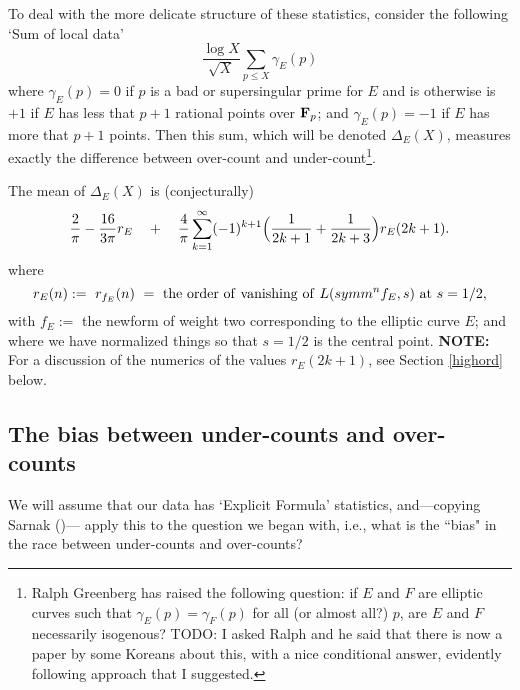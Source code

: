 \documentclass[11pt]{article}
\theoremstyle{plain}
\theoremstyle{definition}
\numberwithin{equation}{section}
\numberwithin{figure}{section}
\numberwithin{table}{section}
\begin{document}
To deal with the more delicate structure of these statistics, consider the following `Sum of local data'
  $${\frac{\log X}{{\sqrt X}}}\sum_{p\le X}\gamma_E(p)$$  where $\gamma_E(p)=0$ if $p$ is a bad or supersingular prime for $E$ and is otherwise is $+1$ if $E$ has less that $p+1$ rational points over ${\bf F}_p$; and $\gamma_E(p) = -1$ if $E$ has more that $p+1$ points.  Then this sum, which will be denoted $\Delta_E(X)$, measures exactly the difference between over-count and under-count{\footnote{  Ralph Greenberg has raised the following question: if $E$ and $F$ are elliptic curves such that $\gamma_E(p)=\gamma_F(p)$ for all (or almost all?) $p$, are $E$ and $F$ necessarily isogenous?  TODO: I asked Ralph and he said that there is now a paper by some Koreans about this, with a nice conditional answer, evidently
  following approach that I suggested.}}. %

 The  mean of $\Delta_E(X)$ is  (conjecturally) \begin{equation*}
{\frac{2}{\pi}}- {\frac{16}{3\pi}}r_E \ \ \ + \ \ \  {\frac{4}{\pi}} \sum_{k=1}^{\infty}  (-1)^{k+1}\Bigl({\frac{1}{2k+1}} + {\frac{1}{2k+3}}\Bigr) r_E({2k+1}).
\end{equation*} where $$r_E(n):= \ r_{f_E}(n)\ = \ {\rm the\ order\ of\ vanishing\ of\ }L(symm^nf_E, s)\ {\rm at}\ s=1/2,$$ with $f_E:=$ the newform of weight two corresponding to the elliptic curve $E$; and where we have normalized things so that $s=1/2$ is the central point. {\bf NOTE:} For a discussion of the numerics of the values $r_E({2k+1})$, see Section {\ref{highord}} below.

\subsection{The bias between under-counts and over-counts}
  We will assume that our data has `Explicit Formula' statistics, and---copying Sarnak ({\cite{S}})--- apply this to the question we began with, i.e., what is the ``bias" in the race between under-counts and over-counts?
\end{document}
